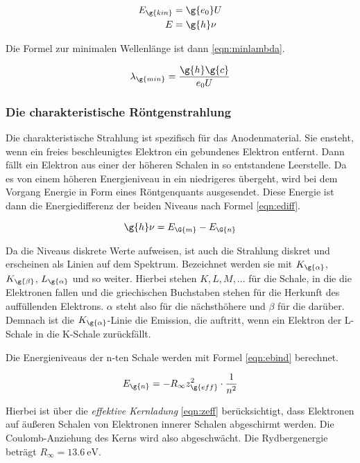 \begin{align}
  E_{\g{kin}} &= \g{e_0} U \label{eqn:Ekin}\\
  E &= \g{h} \nu \label{eqn:Estrahl}
\end{align}

Die Formel zur minimalen Wellenlänge ist dann \eqref{eqn:minlambda}.

\begin{equation}
  \lambda_{\g{min}} = \frac{\g{h} \g{c}}{e_0 U}
  \label{eqn:minlambda}
\end{equation}

\subsubsection{Die charakteristische Röntgenstrahlung}

Die charakteristische Strahlung ist spezifisch für das Anodenmaterial. Sie ensteht,
wenn ein freies beschleunigtes Elektron ein gebundenes Elektron entfernt. Dann
fällt ein Elektron aus einer der höheren Schalen in so entstandene Leerstelle.
Da es von einem höheren Energieniveau in ein niedrigeres übergeht, wird bei dem Vorgang Energie
in Form eines Röntgenquants ausgesendet. Diese Energie ist dann die Energiedifferenz der
beiden Niveaus nach Formel \eqref{eqn:ediff}.

\begin{equation}
  \g{h} \nu = E_{\G{m}}-E_{\G{n}}
  \label{eqn:ediff}
\end{equation}

Da die Niveaus diskrete Werte aufweisen, ist auch die Strahlung diskret und erscheinen
als Linien auf dem Spektrum. Bezeichnet werden sie mit $K_{\g{\alpha}}$, $K_{\g{\beta}}$,
$L_{\g{\alpha}}$ und so weiter.
Hierbei stehen $K, L, M, ...$ für die Schale, in die die Elektronen fallen und
die griechischen Buchstaben stehen für die Herkunft des auffüllenden Elektrons.
$\alpha$ steht also für die nächsthöhere und $\beta$ für die darüber.
Demnach ist die $K_{\g{\alpha}}$-Linie die Emission, die auftritt, wenn ein Elektron
der L-Schale in die K-Schale zurückfällt.

Die Energieniveaus der n-ten Schale werden mit Formel \eqref{eqn:ebind} berechnet.

\begin{equation}
  E_{\g{n}} = -R_{\infty} z_{\g{eff}}^2 \cdot \frac{1}{n^2}
  \label{eqn:ebind}
\end{equation}

Hierbei ist über die \emph{effektive Kernladung} \eqref{eqn:zeff} berücksichtigt, dass
Elektronen auf äußeren Schalen von Elektronen innerer Schalen abgeschirmt werden.
Die Coulomb-Anziehung des Kerns wird also abgeschwächt. Die Rydbergenergie beträgt
$R_{\infty} = \SI{13.6}{\electronvolt}$.


